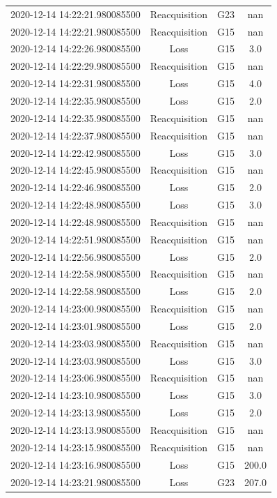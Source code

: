\begin{enumerate}
\begin{longtabu}{cccc}
2020{-}12{-}14 14:22:21.980085500&Reacquisition&G23&nan\\%
2020{-}12{-}14 14:22:21.980085500&Reacquisition&G15&nan\\%
2020{-}12{-}14 14:22:26.980085500&Loss&G15&3.0\\%
2020{-}12{-}14 14:22:29.980085500&Reacquisition&G15&nan\\%
2020{-}12{-}14 14:22:31.980085500&Loss&G15&4.0\\%
2020{-}12{-}14 14:22:35.980085500&Loss&G15&2.0\\%
2020{-}12{-}14 14:22:35.980085500&Reacquisition&G15&nan\\%
2020{-}12{-}14 14:22:37.980085500&Reacquisition&G15&nan\\%
2020{-}12{-}14 14:22:42.980085500&Loss&G15&3.0\\%
2020{-}12{-}14 14:22:45.980085500&Reacquisition&G15&nan\\%
2020{-}12{-}14 14:22:46.980085500&Loss&G15&2.0\\%
2020{-}12{-}14 14:22:48.980085500&Loss&G15&3.0\\%
2020{-}12{-}14 14:22:48.980085500&Reacquisition&G15&nan\\%
2020{-}12{-}14 14:22:51.980085500&Reacquisition&G15&nan\\%
2020{-}12{-}14 14:22:56.980085500&Loss&G15&2.0\\%
2020{-}12{-}14 14:22:58.980085500&Reacquisition&G15&nan\\%
2020{-}12{-}14 14:22:58.980085500&Loss&G15&2.0\\%
2020{-}12{-}14 14:23:00.980085500&Reacquisition&G15&nan\\%
2020{-}12{-}14 14:23:01.980085500&Loss&G15&2.0\\%
2020{-}12{-}14 14:23:03.980085500&Reacquisition&G15&nan\\%
2020{-}12{-}14 14:23:03.980085500&Loss&G15&3.0\\%
2020{-}12{-}14 14:23:06.980085500&Reacquisition&G15&nan\\%
2020{-}12{-}14 14:23:10.980085500&Loss&G15&3.0\\%
2020{-}12{-}14 14:23:13.980085500&Loss&G15&2.0\\%
2020{-}12{-}14 14:23:13.980085500&Reacquisition&G15&nan\\%
2020{-}12{-}14 14:23:15.980085500&Reacquisition&G15&nan\\%
2020{-}12{-}14 14:23:16.980085500&Loss&G15&200.0\\%
2020{-}12{-}14 14:23:21.980085500&Loss&G23&207.0\\%

\end{longtabu}
\end{enumerate}
